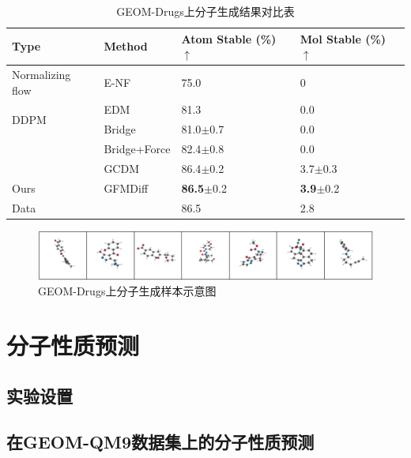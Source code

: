 \begin{table}[h]
    \centering
    \caption{GEOM-Drugs上分子生成结果对比表}
    \label{tab:exp_drugs}
    \begin{tabular}{llll}
    \hline
    Type & Method & Atom Stable (\%) $\uparrow$ & Mol Stable (\%) $\uparrow$ \\
    \hline
    Normalizing flow & E-NF & 75.0 & 0 \\
    \multirow{2}{*}{DDPM}
    & EDM  & 81.3 & 0.0 \\
    & Bridge & 81.0$\pm$0.7 & 0.0 \\
    & Bridge+Force & 82.4$\pm$0.8 & 0.0 \\
    & GCDM & 86.4$\pm$0.2 & 3.7$\pm$0.3 \\
    \hline
    Ours & GFMDiff & \textbf{86.5}$\pm$0.2 & \textbf{3.9}$\pm$0.2 \\
    \hline
    Data &  & 86.5 & 2.8 \\
    \hline
    \end{tabular}
\end{table}
\begin{figure}[h]
    \centering
    \includegraphics[width=\linewidth]{figures/samples_drugs.png}
    \caption{GEOM-Drugs上分子生成样本示意图}
    \label{fig:samples_drugs}
\end{figure}

\section{分子性质预测}

\subsection{实验设置}

\subsection{在GEOM-QM9数据集上的分子性质预测}

